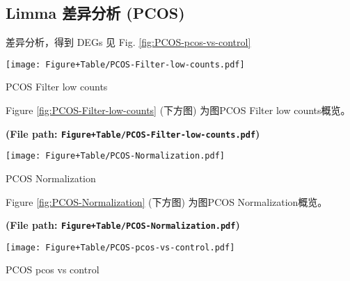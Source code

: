 \documentclass[
]{article}
\begin{document}
\hypertarget{limma-ux5deeux5f02ux5206ux6790-pcos}{%
\subsection{Limma 差异分析 (PCOS)}\label{limma-ux5deeux5f02ux5206ux6790-pcos}}

差异分析，得到 DEGs 见 Fig. \ref{fig:PCOS-pcos-vs-control}

\begin{center}\vspace{1.5cm}\end{center}
\def\@captype{figure}
\begin{center}
\texttt{[image: Figure+Table/PCOS-Filter-low-counts.pdf]}
\caption{PCOS Filter low counts}\label{fig:PCOS-Filter-low-counts}
\end{center}

Figure \ref{fig:PCOS-Filter-low-counts} (下方图) 为图PCOS Filter low counts概览。

\textbf{(File path: \texttt{Figure+Table/PCOS-Filter-low-counts.pdf})}

\begin{center}\vspace{1.5cm}\end{center}

\begin{center}\vspace{1.5cm}\end{center}
\def\@captype{figure}
\begin{center}
\texttt{[image: Figure+Table/PCOS-Normalization.pdf]}
\caption{PCOS Normalization}\label{fig:PCOS-Normalization}
\end{center}

Figure \ref{fig:PCOS-Normalization} (下方图) 为图PCOS Normalization概览。

\textbf{(File path: \texttt{Figure+Table/PCOS-Normalization.pdf})}

\begin{center}\vspace{1.5cm}\end{center}

\begin{center}\vspace{1.5cm}\end{center}
\def\@captype{figure}
\begin{center}
\texttt{[image: Figure+Table/PCOS-pcos-vs-control.pdf]}
\caption{PCOS pcos vs control}\label{fig:PCOS-pcos-vs-control}
\end{center}
\end{document}
